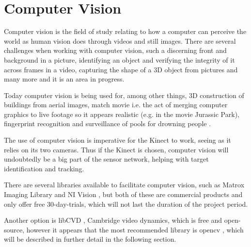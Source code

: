 \section{Computer Vision}
Computer vision is the field of study relating to how a computer can perceive the world as human vision does through videos and still images. There are several challenges when working with computer vision, such a discerning front and background in a picture, identifying an object and verifying the integrity of it across frames in a video, capturing the shape of a 3D object from pictures and many more and it is an area in progress.

Today computer vision is being used for, among other things, 3D construction of buildings from aerial images, match movie i.e. the act of merging computer graphics to live footage so it appears realistic (e.g. in the movie Jurassic Park), fingerprint recognition and surveillance of pools for drowning people \cite{szeliski11}.

The use of computer vision is imperative for the Kinect to work, seeing as it relies on its two cameras. Thus if the Kinect is chosen, computer vision will undoubtedly be a big part of the sensor network, helping with target identification and tracking.

There are several libraries available to facilitate computer vision, such as Matrox Imaging Library \cite{matrox} and NI Vision \cite{nivision}, but both of these are commercial products and only offer free 30-day-trials, which will not last the duration of the project period.
 
Another option is libCVD \citep{libcvd}, Cambridge video dynamics, which is free and open-source, however it appears that the most recommended library is \ac{opencv} \cite{opencv}, which will be described in further detail in the following section.